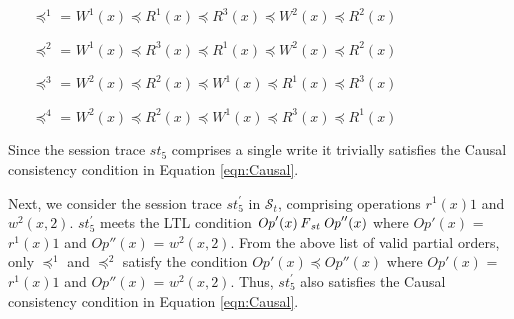 \documentclass[journal,compsoc]{IEEEtran}
\begin{document}
 \begin{itemize}
 \item [$\preccurlyeq^1$ =] $W^1(x)  \preccurlyeq R^1(x) \preccurlyeq R^3(x) \preccurlyeq W^2(x)  \preccurlyeq R^2(x)$ 
 \item [$\preccurlyeq^2$ =] $ W^1(x)  \preccurlyeq R^3(x) \preccurlyeq R^1(x)  \preccurlyeq W^2(x)  \preccurlyeq R^2(x)$
 \item [$\preccurlyeq^3$ =] $   W^2(x)  \preccurlyeq R^2(x) \preccurlyeq  W^1(x)  \preccurlyeq R^1(x) \preccurlyeq R^3(x)$
 \item [$\preccurlyeq^4$ =] $  W^2(x)  \preccurlyeq R^2(x) \preccurlyeq W^1(x)  \preccurlyeq R^3(x) \preccurlyeq R^1(x)  $
 \end{itemize} %
 Since the session trace  $\mathit{st}_5$ comprises a single write it trivially satisfies the Causal consistency condition  in Equation \ref{eqn:Causal}. 
  \par Next, we consider the  session trace $\mathit{st}_5^{'}$ in $\mathcal{S}_t$, comprising operations $r^1(x){1}$ and $w^2(x,2)$. $\mathit{st}_5^{'}$ meets the LTL condition ${\mathit{Op}}'(x) \operatorname{\it F}_\mathit{st} {\mathit{Op}}''(x)$ where ${\mathit{Op}}'(x)$ = $r^1(x){1}$ and  ${\mathit{Op}}''(x)$ = $w^2(x,2)$.  From the above list of valid partial orders, only $\preccurlyeq^1$ and $\preccurlyeq^2$ satisfy the  condition ${\mathit{Op}}'(x) \preccurlyeq {\mathit{Op}}''(x)$ where ${\mathit{Op}}'(x)$ = $r^1(x){1}$ and  ${\mathit{Op}}''(x)$ = $w^2(x,2)$. Thus, $\mathit{st}_5^{'}$ also satisfies the Causal consistency condition in Equation \ref{eqn:Causal}.  %
\end{document}
